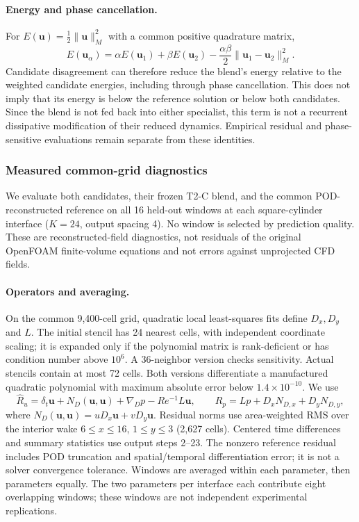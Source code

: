 \paragraph{Energy and phase cancellation.}
For $E(\bm u)=\tfrac12\|\bm u\|_M^2$ with a common positive quadrature matrix,
\begin{equation}
E(\bm u_\alpha)=\alpha E(\bm u_1)+\beta E(\bm u_2)
-\frac{\alpha\beta}{2}\|\bm u_1-\bm u_2\|_M^2.
\end{equation}
Candidate disagreement can therefore reduce the blend's energy relative to the weighted candidate energies, including through phase cancellation. This does not imply that its energy is below the reference solution or below both candidates. Since the blend is not fed back into either specialist, this term is not a recurrent dissipative modification of their reduced dynamics. Empirical residual and phase-sensitive evaluations remain separate from these identities.

\subsubsection{Measured common-grid diagnostics}
\label{app:fusion_measured}
We evaluate both candidates, their frozen T2-C blend, and the common
POD-reconstructed reference on all 16 held-out windows at each square-cylinder
interface ($K=24$, output spacing 4). No window is selected by prediction
quality. These are reconstructed-field diagnostics, not residuals of the
original OpenFOAM finite-volume equations and not errors against unprojected
CFD fields.

\paragraph{Operators and averaging.}
On the common 9,400-cell grid, quadratic local least-squares fits define
$D_x,D_y$ and $L$. The initial stencil has 24 nearest cells, with independent
coordinate scaling; it is expanded only if the polynomial matrix is
rank-deficient or has condition number above $10^6$. A 36-neighbor version
checks sensitivity. Actual stencils contain at most 72 cells. Both versions
differentiate a manufactured quadratic polynomial with maximum absolute
error below $1.4\times10^{-10}$. We use
\begin{equation}
\widehat R_u=\delta_t\bm u+N_D(\bm u,\bm u)+\nabla_Dp-Re^{-1}L\bm u,
\qquad
\widehat R_p=Lp+D_xN_{D,x}+D_yN_{D,y},
\end{equation}
where $N_D(\bm u,\bm u)=uD_x\bm u+vD_y\bm u$.
Residual norms use area-weighted RMS over the interior wake
$6\leq x\leq16$, $1\leq y\leq3$ (2,627 cells).
Centered time differences and summary statistics use output steps 2--23.
The nonzero reference residual includes POD truncation and spatial/temporal
differentiation error; it is not a solver convergence tolerance. Windows
are averaged within each parameter, then parameters equally. The two
parameters per interface each contribute eight overlapping windows;
these windows are not independent experimental replications.

